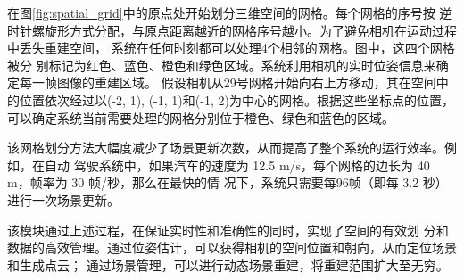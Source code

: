 \par 在图\ref{fig:spatial_grid}中的原点处开始划分三维空间的网格。每个网格的序号按
逆时针螺旋形方式分配，与原点距离越近的网格序号越小。为了避免相机在运动过程中丢失重建空间，
系统在任何时刻都可以处理4个相邻的网格。图中，这四个网格被分
别标记为红色、蓝色、橙色和绿色区域。系统利用相机的实时位姿信息来确定每一帧图像的重建区域。
假设相机从29号网格开始向右上方移动，其在空间中的位置依次经过以(-2, 1), (-1, 1)和(-1, 2)为中心的网格。根据这些坐标点的位置，
可以确定系统当前需要处理的网格分别位于橙色、绿色和蓝色的区域。

\par 该网格划分方法大幅度减少了场景更新次数，从而提高了整个系统的运行效率。例如，在自动
驾驶系统中，如果汽车的速度为 12.5 m/s，每个网格的边长为 40 m，帧率为 30 帧/秒，那么在最快的情
况下，系统只需要每96帧（即每 3.2 秒）进行一次场景更新。

\par 该模块通过上述过程，在保证实时性和准确性的同时，实现了空间的有效划
分和数据的高效管理。通过位姿估计，可以获得相机的空间位置和朝向，从而定位场景和生成点云；
通过场景管理，可以进行动态场景重建，将重建范围扩大至无穷。